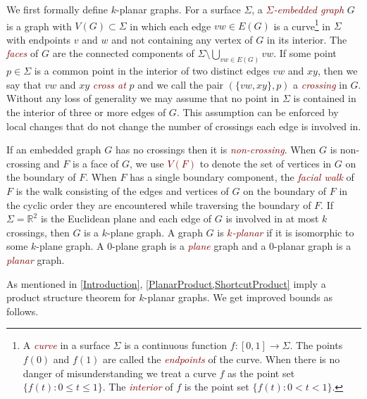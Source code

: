 \documentclass{patmorin}
\theoremstyle{plain}
\theoremstyle{definition}
\newcommand{\defin}[1]{\textcolor{Maroon}{\emph{#1}}}
\renewcommand{\le}{\leqslant}
\newcommand{\R}{\mathbb{R}}
\begin{document}
We first formally define $k$-planar graphs.  For a surface $\Sigma$,  a \defin{$\Sigma$-embedded graph} $G$ is a graph with $V(G)\subset\Sigma$ in which each edge $vw\in E(G)$ is a curve\footnote{A \defin{curve} in a surface $\Sigma$ is a continuous function $f:[0,1]\to \Sigma$. The points $f(0)$ and $f(1)$ are called the \defin{endpoints} of the curve.  When there is no danger of misunderstanding we treat a curve $f$ as the point set $\{f(t):0\le t\le 1\}$.  The \defin{interior} of $f$ is the point set $\{f(t):0<t<1\}$.} in $\Sigma$ with endpoints $v$ and $w$ and not containing any vertex of $G$ in its interior. The \defin{faces} of $G$ are the connected components of $\Sigma\setminus \bigcup_{vw\in E(G)} vw$.
If some point $p\in\Sigma$ is a common point in the interior of two distinct edges $vw$ and $xy$, then we say that $vw$ and $xy$ \defin{cross at} $p$ and we call the pair $(\{vw,xy\},p)$ a \defin{crossing} in $G$.  Without any loss of generality we may assume that no point in $\Sigma$ is contained in the interior of three or more edges of $G$.  This assumption can be enforced by local changes that do not change the number of crossings each edge is involved in.



If an embedded graph $G$  has no crossings then it is \defin{non-crossing}.  When $G$ is non-crossing and $F$ is a face of $G$, we use \defin{$V(F)$} to denote the set of vertices in $G$ on the boundary of $F$.  When $F$ has a single boundary component, the \defin{facial walk} of $F$ is the walk consisting of the edges and vertices of $G$ on the boundary of $F$ in the cyclic order they are encountered while traversing the boundary of $F$.  If  $\Sigma=\R^2$ is the Euclidean plane and each edge of $G$ is involved in at most $k$ crossings, then $G$ is a $k$-plane graph.  A graph $G$ is \defin{$k$-planar} if it is isomorphic to some $k$-plane graph.  A $0$-plane graph is a \defin{plane} graph and a $0$-planar graph is a \defin{planar} graph.


As mentioned in \cref{Introduction}, \cref{PlanarProduct,ShortcutProduct} imply a product structure theorem for $k$-planar graphs. We get improved bounds as follows.
\end{document}

